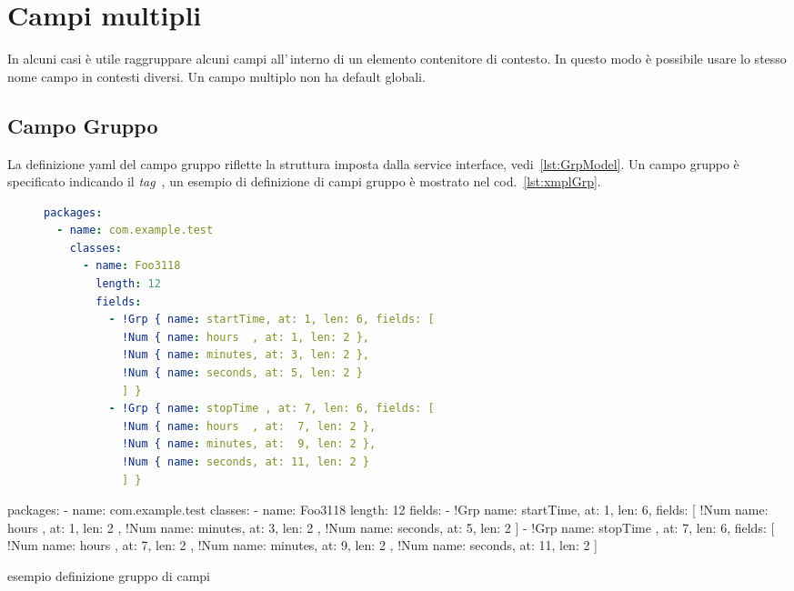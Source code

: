 \section{Campi multipli}
In alcuni casi è utile raggruppare alcuni campi all'\,interno di un elemento
contenitore di contesto. In questo modo è possibile usare lo stesso nome campo
in contesti diversi. Un campo multiplo non ha default globali.

\subsection{Campo Gruppo} \label{sub:yaml.grp}
La definizione yaml del campo gruppo riflette la struttura imposta dalla
service interface, vedi~\ref{lst:GrpModel}.
Un campo gruppo è specificato indicando il \textsl{tag} 
\,, 
un esempio di definizione di campi gruppo è mostrato nel 
cod.~\ref{lst:xmplGrp}.

\ifesource
\begin{figure*}[!htb]
\begin{lstlisting}[language=yaml, 
caption={esempio definizione gruppo di campi}, 
label=lst:xmplGrp]
packages:
  - name: com.example.test
    classes:
      - name: Foo3118
        length: 12
        fields:
          - !Grp { name: startTime, at: 1, len: 6, fields: [
            !Num { name: hours  , at: 1, len: 2 }, 
            !Num { name: minutes, at: 3, len: 2 }, 
            !Num { name: seconds, at: 5, len: 2 }
            ] }
          - !Grp { name: stopTime , at: 7, len: 6, fields: [
            !Num { name: hours  , at:  7, len: 2 }, 
            !Num { name: minutes, at:  9, len: 2 }, 
            !Num { name: seconds, at: 11, len: 2 }
            ] }
\end{lstlisting}
\end{figure*}
\else
\begin{elisting}[!htb]
\begin{yamlcode}
packages:
  - name: com.example.test
    classes:
      - name: Foo3118
        length: 12
        fields:
          - !Grp { name: startTime, at: 1, len: 6, fields: [
            !Num { name: hours  , at: 1, len: 2 }, 
            !Num { name: minutes, at: 3, len: 2 }, 
            !Num { name: seconds, at: 5, len: 2 }
            ] }
          - !Grp { name: stopTime , at: 7, len: 6, fields: [
            !Num { name: hours  , at:  7, len: 2 }, 
            !Num { name: minutes, at:  9, len: 2 }, 
            !Num { name: seconds, at: 11, len: 2 }
            ] }
\end{yamlcode}
\caption{esempio definizione gruppo di campi}
\label{lst:xmplGrp}
\end{elisting}
\fi

